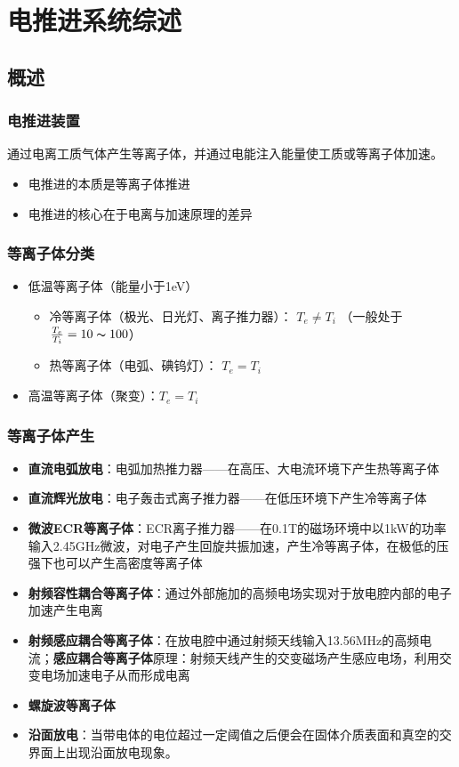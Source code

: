 \chapter{电推进系统综述}

\section{概述}

\subsection{电推进装置}

通过电离工质气体产生等离子体，并通过电能注入能量使工质或等离子体加速。
\begin{itemize}
    \item 电推进的本质是等离子体推进
    \item 电推进的核心在于电离与加速原理的差异
\end{itemize}

\subsection{等离子体分类}

\begin{itemize}
    \item 低温等离子体（能量小于1eV）
    \begin{itemize}
        \item 冷等离子体（极光、日光灯、离子推力器）： $T_e \neq T_i$ （一般处于 $\frac{T_e}{T_i} = 10 \thicksim 100$）
        \item 热等离子体（电弧、碘钨灯）： $T_e = T_i$
    \end{itemize}
    \item 高温等离子体（聚变）：$T_e= T_i$
\end{itemize}

\subsection{等离子体产生}

\begin{itemize}
    \item \textbf{直流电弧放电}：电弧加热推力器——在高压、大电流环境下产生热等离子体
    \item \textbf{直流辉光放电}：电子轰击式离子推力器——在低压环境下产生冷等离子体
    \item \textbf{微波ECR等离子体}：ECR离子推力器——在0.1T的磁场环境中以1kW的功率输入2.45GHz微波，对电子产生回旋共振加速，产生冷等离子体，在极低的压强下也可以产生高密度等离子体
    \item \textbf{射频容性耦合等离子体}：通过外部施加的高频电场实现对于放电腔内部的电子加速产生电离
    \item \textbf{射频感应耦合等离子体}：在放电腔中通过射频天线输入13.56MHz的高频电流；\textbf{感应耦合等离子体}原理：射频天线产生的交变磁场产生感应电场，利用交变电场加速电子从而形成电离
    \item \textbf{螺旋波等离子体}
    \item \textbf{沿面放电}：当带电体的电位超过一定阈值之后便会在固体介质表面和真空的交界面上出现沿面放电现象。
\end{itemize}

